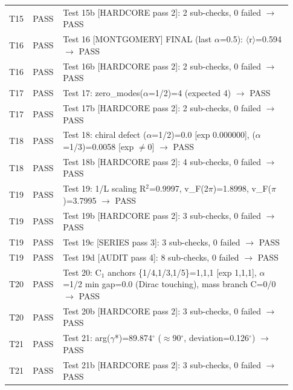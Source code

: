 \documentclass[10pt]{article}
\begin{document}
\begin{longtable}{p{0.06\linewidth} p{0.09\linewidth} p{0.78\linewidth}}
T15 & PASS & Test 15b [HARDCORE pass 2]: 2 sub-checks, 0 failed $\rightarrow$ PASS \\

T16 & PASS & Test 16 [MONTGOMERY] FINAL (last $\alpha$=0.5): $\langle$r$\rangle$=0.594 $\rightarrow$ PASS \\

T16 & PASS & Test 16b [HARDCORE pass 2]: 2 sub-checks, 0 failed $\rightarrow$ PASS \\

T17 & PASS & Test 17: zero\_modes($\alpha$=1/2)=4 (expected 4) $\rightarrow$ PASS \\

T17 & PASS & Test 17b [HARDCORE pass 2]: 2 sub-checks, 0 failed $\rightarrow$ PASS \\

T18 & PASS & Test 18: chiral defect ($\alpha$=1/2)=0.0 [exp 0.000000], ($\alpha$=1/3)=0.0058 [exp $\neq$0] $\rightarrow$ PASS \\

T18 & PASS & Test 18b [HARDCORE pass 2]: 4 sub-checks, 0 failed $\rightarrow$ PASS \\

T19 & PASS & Test 19: 1/L scaling R$^2$=0.9997, v\_F(2$\pi$)=1.8998, v\_F($\pi$)=3.7995 $\rightarrow$ PASS \\

T19 & PASS & Test 19b [HARDCORE pass 2]: 3 sub-checks, 0 failed $\rightarrow$ PASS \\

T19 & PASS & Test 19c [SERIES pass 3]: 3 sub-checks, 0 failed $\rightarrow$ PASS \\

T19 & PASS & Test 19d [AUDIT pass 4]: 8 sub-checks, 0 failed $\rightarrow$ PASS \\

T20 & PASS & Test 20: C$_1$ anchors \{1/4,1/3,1/5\}=1,1,1 [exp 1,1,1], $\alpha$=1/2 min gap=0.0 (Dirac touching), mass branch C=0/0 $\rightarrow$ PASS \\

T20 & PASS & Test 20b [HARDCORE pass 2]: 3 sub-checks, 0 failed $\rightarrow$ PASS \\

T21 & PASS & Test 21: arg($\gamma$*)=89.874$^\circ$ ($\approx$90$^\circ$, deviation=0.126$^\circ$) $\rightarrow$ PASS \\

T21 & PASS & Test 21b [HARDCORE pass 2]: 3 sub-checks, 0 failed $\rightarrow$ PASS \\


\end{longtable}
\end{document}

